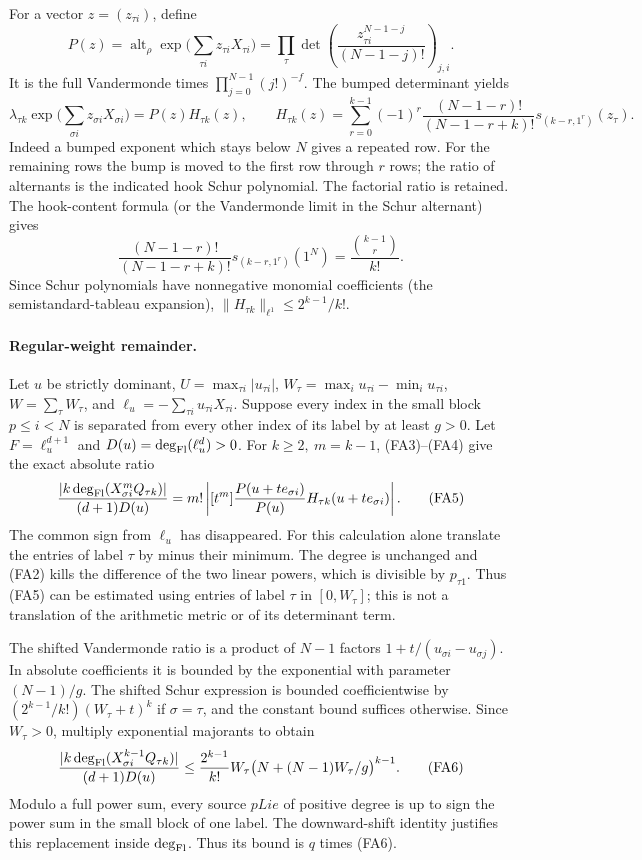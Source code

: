 For a vector \(z=(z_{\tau i})\), define
\[
 P(z)=\operatorname{alt}_{\rho}\exp\Big(\sum_{\tau i}z_{\tau i}X_{\tau i}\Big)
     =\prod_\tau\det\left(\frac{z_{\tau i}^{N-1-j}}{(N-1-j)!}\right)_{j,i}.
\]
It is the full Vandermonde times \(\prod_{j=0}^{N-1}(j!)^{-f}\).
The bumped determinant yields
\[
 \lambda_{\tau k}\exp\Big(\sum_{\sigma i}z_{\sigma i}X_{\sigma i}\Big)
 =P(z)H_{\tau k}(z),\qquad
 H_{\tau k}(z)=
 \sum_{r=0}^{k-1}(-1)^r\frac{(N-1-r)!}{(N-1-r+k)!}
 s_{(k-r,1^r)}(z_\tau).
 \tag{FA4}
\]
Indeed a bumped exponent which stays below \(N\) gives a repeated
row. For the remaining rows the bump is moved to the first row
through \(r\) rows; the ratio of alternants is the indicated hook
Schur polynomial. The factorial ratio is retained.
The hook-content formula (or the Vandermonde limit in the
Schur alternant) gives
\[
 \frac{(N-1-r)!}{(N-1-r+k)!}s_{(k-r,1^r)}(1^N)
   =\frac{\binom{k-1}{r}}{k!}.
\]
Since Schur polynomials have nonnegative monomial coefficients
(the semistandard-tableau expansion),
\(\|H_{\tau k}\|_{\ell^1}\le 2^{k-1}/k!\).

\paragraph{Regular-weight remainder.}
Let \(u\) be strictly dominant, \(U=\max_{\tau i}|u_{\tau i}|\),
\(W_\tau=\max_i u_{\tau i}-\min_i u_{\tau i}\),
\(W=\sum_\tau W_\tau\), and
\(\ell_u=-\sum_{\tau i}u_{\tau i}X_{\tau i}\).
Suppose every index in the small block \(p\le i<N\) is separated
from every other index of its label by at least \(g>0\).
Let \(F=\ell_u^{d+1}\) and \(D(u)=\deg_{\rm Fl}(\ell_u^d)>0\).
For \(k\ge2,\ m=k-1\), (FA3)--(FA4) give the exact absolute ratio
\[
 \frac{|k\deg_{\rm Fl}(X_{\sigma i}^{m}Q_{\tau k})|}
 {(d+1)D(u)}
 =m!\left|[t^m]\frac{P(u+t e_{\sigma i})}{P(u)}
                    H_{\tau k}(u+t e_{\sigma i})\right|.
 \tag{FA5}
\]
The common sign from \(\ell_u\) has disappeared. For this calculation
alone translate the entries of label \(\tau\) by minus their
minimum. The degree is unchanged and (FA2) kills the difference
of the two linear powers, which is divisible by \(p_{\tau1}\).
Thus (FA5) can be estimated using entries of label \(\tau\)
in \([0,W_\tau]\); this is not a translation of the arithmetic
metric or of its determinant term.

The shifted Vandermonde ratio is a product of \(N-1\) factors
\(1+t/(u_{\sigma i}-u_{\sigma j})\). In absolute coefficients it is
bounded by the exponential with parameter \((N-1)/g\).
The shifted Schur expression is bounded coefficientwise by
\((2^{k-1}/k!)(W_\tau+t)^k\) if \(\sigma=\tau\), and the
constant bound suffices otherwise. Since
\(W_\tau>0\), multiply exponential majorants to obtain
\[
 \frac{|k\deg_{\rm Fl}(X_{\sigma i}^{k-1}Q_{\tau k})|}
 {(d+1)D(u)}
 \le\frac{2^{k-1}}{k!}W_\tau
       \bigl(N+(N-1)W_\tau/g\bigr)^{k-1}.
 \tag{FA6}
\]
Modulo a full power sum, every source \(pLie\) of positive
degree is up to sign the power sum in the small block of one label.
The downward-shift identity justifies this replacement inside
\(\deg_{\rm Fl}\). Thus its bound is \(q\) times (FA6).

